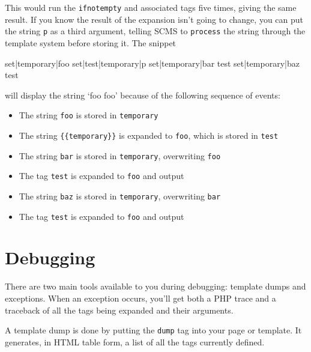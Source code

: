 This would run the \texttt{ifnotempty} and associated tags five times, giving the same result. If you know
the result of the expansion isn't going to change, you can put the string \texttt{p} as a third argument,
telling SCMS to \texttt{process} the string through the template system before storing it.
The snippet
\begin{MyVerbatim}
{{set|temporary|foo}}
{{set|test|{{temporary}}|p}}
{{set|temporary|bar}}
{{test}}
{{set|temporary|baz}}
{{test}}
\end{MyVerbatim}
will display the string `foo foo' because of the following sequence of events:
\begin{itemize}
\item The string \texttt{foo} is stored in \texttt{temporary}
\item The string \verb,{{temporary}}, is expanded to \texttt{foo}, which is stored in \texttt{test}
\item The string \texttt{bar} is stored in \texttt{temporary}, overwriting \texttt{foo}
\item The tag \texttt{test} is expanded to \verb,foo, and output
\item The string \texttt{baz} is stored in \texttt{temporary}, overwriting \texttt{bar}
\item The tag \texttt{test} is expanded to \verb,foo, and output
\end{itemize}

\section{Debugging}
There are two main tools available to you during debugging: template dumps and exceptions.
When an exception occurs, you'll get both a PHP trace and a traceback of all the tags being expanded
and their arguments.

A template dump is done by putting the \texttt{dump} tag into your page or template. It generates,
in HTML table form, a list of all the tags currently defined.
